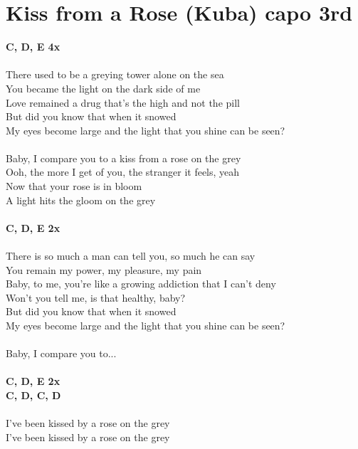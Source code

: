 \section{Kiss from a Rose (Kuba) capo 3rd}
\footnotesize\textbf{C, D, E 4x}\\
\\
\normalsize
{}There used to be a greying tower alone on the sea\\
You became the light on the dark side of me\\
Love remained a drug that's the high and not the pill\\
But did you know that when it snowed\\
My eyes become large and the light that you shine can be seen?\\
\\
Baby, I compare you to a kiss from a rose on the grey\\
Ooh, the more I get of you, the stranger it feels, yeah\\
Now that your rose is in bloom\\
A light hits the gloom on the grey\\
\\
\footnotesize\textbf{C, D, E 2x}\\
\\
\normalsize
There is so much a man can tell you, so much he can say\\
You remain my power, my pleasure, my pain\\
Baby, to me, you're like a growing addiction that I can't deny\\
Won't you tell me, is that healthy, baby?\\
But did you know that when it snowed\\
My eyes become large and the light that you shine can be seen?\\
\\
Baby, I compare you to...\\
\\
\footnotesize\textbf{C, D, E 2x\\
C, D, C, D} \\
\\
\normalsize
{}I've been kissed by a rose on the grey\\
I've been kissed by a rose on the grey\\
